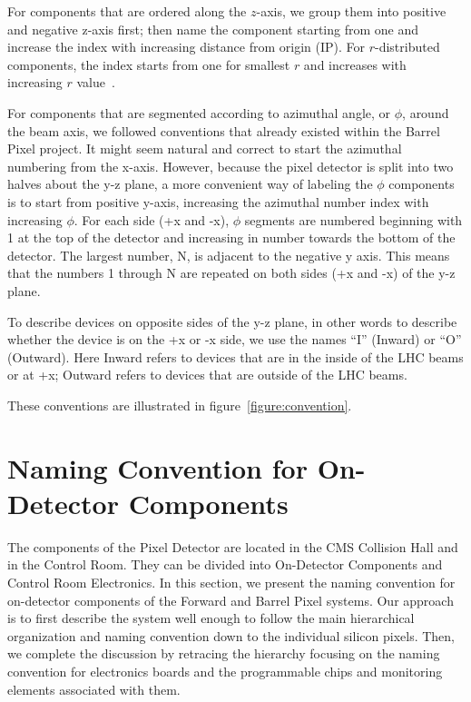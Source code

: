 \documentclass{cmspaper}
\begin{document}
For components that
are ordered along the $z$-axis, 
we group them into positive and negative z-axis first;
then name the component starting from one and increase the 
index with increasing distance from origin (IP). For $r$-distributed 
components, the index starts from one for smallest $r$ 
and increases with increasing $r$ value~\cite{DataModel}. 

For components that are segmented according to azimuthal angle, or $\phi$,
around the beam axis, we followed conventions that already existed within the
Barrel Pixel project.
It might seem natural and correct to start the azimuthal numbering from 
the x-axis.
However, because the pixel detector is split into two halves 
about the  y-z plane,
a more convenient way of labeling the $\phi$ components is to 
start from positive y-axis, increasing the azimuthal number index
with increasing $\phi$. 
For each side (+x and -x), $\phi$ segments are numbered beginning
with 1  at the top of the detector and increasing in number towards the
bottom of the detector. The largest number, N,  is adjacent to the negative 
y axis.  This means that the numbers 1 through N are repeated on both sides 
(+x and -x) of the y-z plane. 

To describe devices on opposite sides of the y-z plane, in other words
to describe whether the device is on the +x or -x side, we use the
names ``I'' (Inward) or ``O'' (Outward). Here Inward refers to devices
that are in the inside of the LHC beams or at +x; Outward refers to devices
that are outside of the LHC beams.

These conventions are illustrated in figure~\ref{figure:convention}. 


\section{Naming Convention for On-Detector Components}

The  components of the Pixel Detector are located in the CMS Collision Hall 
and in the Control Room. They can be divided into On-Detector Components
and Control Room Electronics. In this section, we present the naming convention
for on-detector components of the Forward and Barrel Pixel systems. Our 
approach is to first describe the system well enough to follow the main 
hierarchical organization and naming convention down to the individual 
silicon pixels. Then, we 
complete the discussion by retracing the hierarchy focusing on
the naming convention for electronics 
boards and the programmable chips and monitoring elements
associated with them.  
\end{document}
